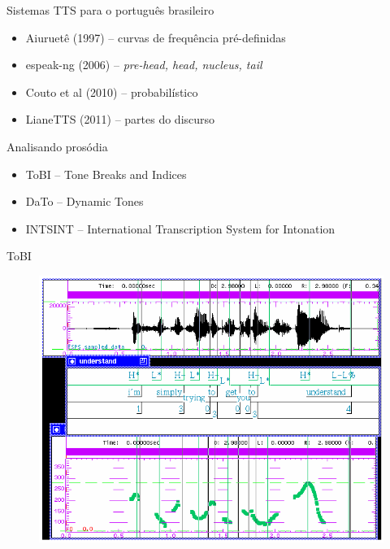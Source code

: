 \documentclass{beamer}
\begin{document}
\begin{frame}{Sistemas TTS para o português brasileiro}
  \begin{itemize}
      \item Aiuruetê (1997) -- curvas de frequência pré-definidas
      \item espeak-ng (2006) -- \emph{pre-head, head, nucleus, tail}
      \item Couto et al (2010) -- probabilístico
      \item LianeTTS (2011) -- partes do discurso
  \end{itemize}
\end{frame}

\begin{frame}{Analisando prosódia}
  \begin{itemize}
  \item ToBI -- Tone Breaks and Indices
  \item DaTo -- Dynamic Tones
  \item INTSINT -- International Transcription System for Intonation
  \end{itemize}
\end{frame}

\begin{frame}{ToBI}
    \begin{figure}
      \includegraphics[scale=0.40]{tobi.png}
    \end{figure}
\end{frame}
\end{document}
